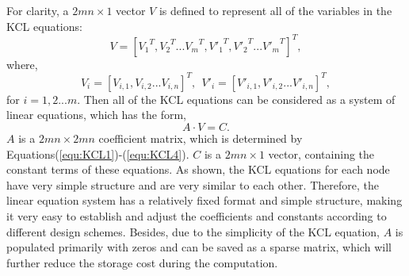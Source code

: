 For clarity, a ${2mn\times 1}$ vector ${V}$ is defined to represent all of the variables in the KCL equations:
\begin{equation}\label{equ:V1}
{V}=[{V_1}^T,{V_2}^T...{V_m}^T,{V'_1}^T,{V'_2}^T...{V'_m}^T]^T,
\end{equation}
where,
\begin{equation}\label{equ:V2}
{V_i} = [V_{i,1},V_{i,2}...V_{i,n}]^T,~~{V'_i} = [V'_{i,1},V'_{i,2}...V'_{i,n}]^T,
\end{equation}
for $i=1,2...m$. Then all of the KCL equations can be considered as a system of linear equations, which has the form,
\begin{equation}\label{equ:matrix}
A\cdot V = C.
\end{equation}
$A$ is a ${2mn\times{2mn}}$ coefficient matrix, which is determined by
Equations(\ref{equ:KCL1})-(\ref{equ:KCL4}). $C$ is a ${2mn\times{1}}$
vector, containing the constant terms of these equations. As shown, the
KCL equations for each node have very simple structure and are very
similar to each other. Therefore, the linear equation system has a
relatively fixed format and simple structure, making it very easy to
establish and adjust the coefficients and constants according to different
design schemes. Besides, due to the simplicity of the KCL equation, $A$ is
populated primarily with zeros and can be saved as a sparse matrix, which
will further reduce the storage cost during the computation.

